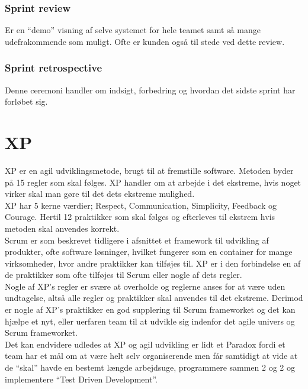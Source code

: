 \subsubsection{Sprint review}
Er en “demo” visning af selve systemet for hele teamet samt så mange udefrakommende som muligt. Ofte er kunden også til stede ved dette review.

\subsubsection{Sprint retrospective}
Denne ceremoni handler om indsigt, forbedring og hvordan det sidste sprint har forløbet sig.

\section{XP}\label{sec:xp}
XP er en agil udviklingsmetode, brugt til at fremstille software. Metoden byder på 15 regler som skal følges. XP handler om at arbejde i det ekstreme, 
hvis noget virker skal man gøre til det dets ekstreme mulighed.  \\

XP har 5 kerne værdier; Respect, Communication, Simplicity, Feedback og Courage. Hertil 12 praktikker som skal følges og efterleves til 
ekstrem hvis metoden skal anvendes korrekt. \\

Scrum er som beskrevet tidligere i afsnittet et framework til udvikling af produkter, ofte software løsninger, hvilket fungerer som en 
container for mange virksomheder, hvor andre praktikker kan tilføjes til. XP er i den forbindelse en af de praktikker som ofte tilføjes til 
Scrum eller nogle af dets regler. \\

Nogle af XP’s regler er svære at overholde og reglerne anses for at være uden undtagelse, altså alle regler og praktikker skal anvendes til 
det ekstreme. Derimod er nogle af XP’s praktikker en god supplering til Scrum frameworket og det kan hjælpe et nyt, eller uerfaren team til at 
udvikle sig indenfor det agile univers og Scrum frameworket. \\

Det kan endvidere udledes at XP og agil udvikling er lidt et Paradox fordi et team har et mål om at være helt selv organiserende men får 
samtidigt at vide at de “skal” havde en bestemt længde arbejdsuge, programmere sammen 2 og 2 og implementere “Test Driven Development”. 

